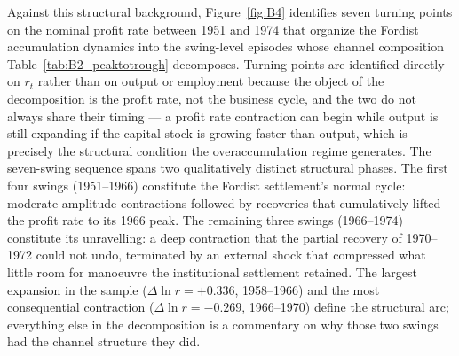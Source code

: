 Against this structural background, Figure~\ref{fig:B4} identifies seven
turning points on the nominal profit rate between 1951 and 1974 that
organize the Fordist accumulation dynamics into the swing-level episodes
whose channel composition Table~\ref{tab:B2_peaktotrough} decomposes.
Turning points are identified directly on $r_{t}$ rather than on output
or employment because the object of the decomposition is the profit rate,
not the business cycle, and the two do not always share their timing ---
a profit rate contraction can begin while output is still expanding if
the capital stock is growing faster than output, which is precisely the
structural condition the overaccumulation regime generates. The
seven-swing sequence spans two qualitatively distinct structural phases.
The first four swings (1951--1966) constitute the Fordist settlement's
normal cycle: moderate-amplitude contractions followed by recoveries
that cumulatively lifted the profit rate to its 1966 peak. The remaining
three swings (1966--1974) constitute its unravelling: a deep contraction
that the partial recovery of 1970--1972 could not undo, terminated by
an external shock that compressed what little room for manoeuvre the
institutional settlement retained. The largest expansion in the sample
($\Delta\ln r = +0.336$, 1958--1966) and the most consequential
contraction ($\Delta\ln r = -0.269$, 1966--1970) define the structural
arc; everything else in the decomposition is a commentary on why those
two swings had the channel structure they did.


